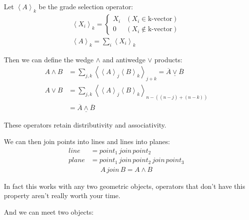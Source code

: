 \documentclass[twoside]{article}
\newcommand{\M}[1]{\scriptstyle{#1}} %
\newcommand{\T}[1]{\textrm{#1}} %
\newcommand{\join}{{\,\M{join}\,}}
\newcommand{\braket}[1]{\left\langle{#1}\right\rangle}
\newcommand{\aside}[1]{\begin{flushright}\scriptsize{#1}\end{flushright}}
\newcommand{\boxedmath}[1]{\begin{center}\boxed{$$#1$$}\end{center}
    }
\begin{document}
\begin{multicols*}{2}
            \par
                Let $ \braket{A}_k $ be the grade selection operator:
                \begin{gather*}
                    \braket{X_i}_k = \begin{cases}
                        X_i & (X_i \in \T{k-vector}) \\
                        0 & (X_i \notin \T{k-vector})
                    \end{cases} \\
                    \braket{A}_k = \sum_i \braket{X_i}_k
                \end{gather*}
            \par
                Then we can define the wedge $ \wedge $ and antiwedge $ \vee $ products:
                \begin{align*}
                    A \wedge B &= \sum_{j,k} \braket{\braket{A}_j \braket{B}_k}_{j+k} = \underline{\overline{A} \vee \overline{B}} \\ %
                    A \vee B &= \sum_{j,k} \braket{\braket{A}_j \braket{B}_k}_{n-((n-j)+(n-k))} \\
                    &= \underline{\overline{A} \wedge \overline{B}}
                \end{align*}
                \aside{These operators retain distributivity and associativity.}
            \par
                We can then join points into lines and lines into planes:
                \begin{align*}
                    line &= point_1 \join point_2 \\
                    plane &= point_1 \join point_2 \join point_3
                \end{align*} \vspace{-25px}
                \begin{align*}
                    A \join B = A \wedge B
                \end{align*}
                \boxedmath{\begin{aligned}
                    A \join B = A \vee B
                \end{aligned}}
                \aside{In fact this works with any two geometric objects, operators that don't have this property aren't really worth your time.}
            \par
                And we can meet two objects:
                \begin{align*}

\end{align*}
\end{multicols*}
\end{document}
